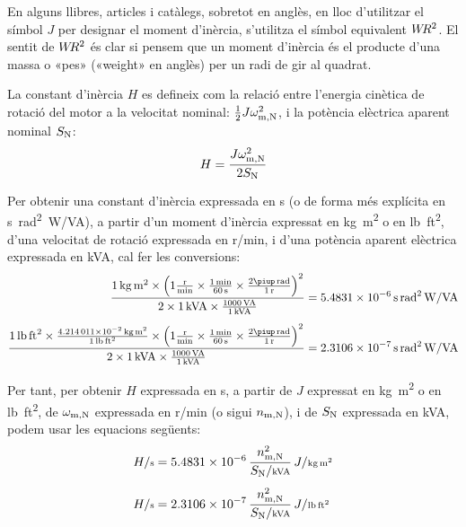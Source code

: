 En alguns llibres, articles i catàlegs, sobretot en anglès, en lloc d'utilitzar el símbol $J$ per designar el moment d'inèrcia, s'utilitza el símbol equivalent $W\hspace{-0.2em}R^2$. El sentit de $W\hspace{-0.2em}R^2$ és clar si pensem que un moment d'inèrcia és el producte d'una massa o «pes» («weight» en anglès) per un radi de gir al quadrat.

La constant d'inèrcia $H$ es defineix com la relació entre l'energia cinètica de rotació del motor  a la velocitat nominal: $\frac{1}{2} J \omega\ped{m,N}^2$, i la  potència elèctrica aparent nominal $S\ped{N}$:
\begin{equation}\index{constant d'inèria}\index{J@$H$}
    H = \frac{J \omega\ped{m,N}^2}{2 S\ped{N}}
\end{equation}

Per  obtenir una constant d'inèrcia  expressada en \si{s} (o de forma més explícita en \si{s.rad^2.W/VA}), a partir d'un moment d'inèrcia expressat en \si{kg.m^2} o en \si{lb.ft^2}, d'una velocitat de rotació expressada en \si{r/min}, i d'una potència aparent elèctrica expressada en \si{kVA}, cal  fer les conversions:
\begin{subequations}
\begin{align}
    \frac{\SI{1}{kg.m^2} \times \left(1\frac{\si{r}}{\si{min}} \times \frac{\SI{1}{min}}{\SI{60}{s}} \times \frac{2\piup\,\si{rad}}{\SI{1}{r}}\right)^2}{2\times \SI{1}{kVA} \times \frac{\SI{1000}{VA}}{\SI{1}{kVA}}}  &= \SI{5,4831e-6}{s.rad^2.W/VA} \\[1ex]
   \frac{\SI{1}{lb.ft^2} \times \frac{\SI{4,214011e-2}{kg.m^2}}{\SI{1}{lb.ft^2}} \times \left(1\frac{\si{r}}{\si{min}} \times \frac{\SI{1}{min}}{\SI{60}{s}} \times \frac{2\piup\,\si{rad}}{\SI{1}{r}}\right)^2}{2\times \SI{1}{kVA}  \times
   \frac{\SI{1000}{VA}}{\SI{1}{kVA}}} &= \SI{2,3106e-7}{s.rad^2.W/VA}
\end{align}
\end{subequations}

Per tant, per  obtenir $H$ expressada en \si{s}, a partir de $J$  expressat en \si{kg.m^2} o en \si{lb.ft^2}, de $\omega\ped{m,N}$ expressada en \si{r/min} (o sigui $n\ped{m,N}$), i de $S\ped{N}$ expressada en \si{kVA}, podem usar les equacions següents:
\begin{subequations}
\begin{align}
    H/{\scriptstyle \si{s}} &= \num{5,4831e-6}\,  \frac{n\ped{m,N}^2}{S\ped{N}/{\scriptstyle \si{kVA}}} \, J/{\scriptstyle \si{kg.m^2}} \\[1ex]
    H/{\scriptstyle \si{s}} &= \num{2,3106e-7}\,  \frac{n\ped{m,N}^2}{S\ped{N}/{\scriptstyle \si{kVA}}} \, J/{\scriptstyle \si{lb.ft^2}}
\end{align}
\end{subequations}

